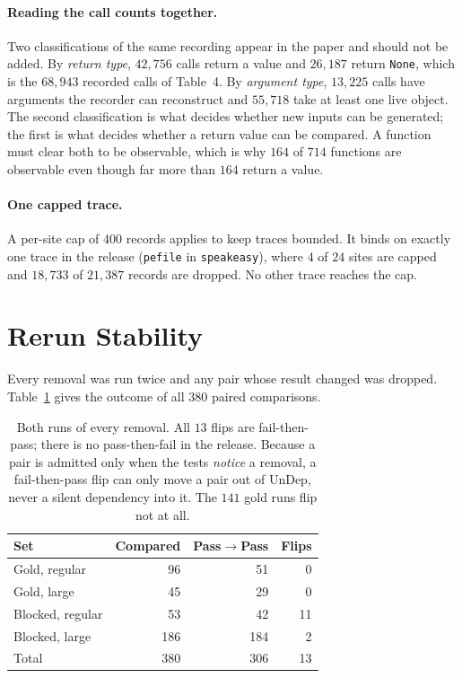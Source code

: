 \paragraph{Reading the call counts together.}
Two classifications of the same recording appear in the paper and should
not be added. By \emph{return type}, $42{,}756$ calls return a value and
$26{,}187$ return \texttt{None}, which is the $68{,}943$ recorded calls
of Table~4. By \emph{argument type}, $13{,}225$ calls have arguments the
recorder can reconstruct and $55{,}718$ take at least one live object.
The second classification is what decides whether new inputs can be
generated; the first is what decides whether a return value can be
compared. A function must clear both to be observable, which is why
$164$ of $714$ functions are observable even though far more than $164$
return a value.

\paragraph{One capped trace.}
A per-site cap of $400$ records applies to keep traces bounded. It binds
on exactly one trace in the release (\texttt{pefile} in
\texttt{speakeasy}), where $4$ of $24$ sites are capped and $18{,}733$
of $21{,}387$ records are dropped. No other trace reaches the cap.

\section{Rerun Stability}
\label{app:flakiness}

Every removal was run twice and any pair whose result changed was
dropped. Table~\ref{tab:flakiness} gives the outcome of all $380$
paired comparisons.

\begin{table}[t]
\centering\small
\begin{tabular}{@{}lrrr@{}}
\toprule
Set & Compared & Pass$\to$Pass & Flips \\
\midrule
Gold, regular     &  96 & 51 & 0 \\
Gold, large       &  45 & 29 & 0 \\
Blocked, regular  &  53 & 42 & 11 \\
Blocked, large    & 186 & 184 & 2 \\
\midrule
Total             & 380 & 306 & 13 \\
\bottomrule
\end{tabular}
\caption{Both runs of every removal. All $13$ flips are
fail-then-pass; there is no pass-then-fail in the release. Because a
pair is admitted only when the tests \emph{notice} a removal, a
fail-then-pass flip can only move a pair out of UnDep, never a silent
dependency into it. The $141$ gold runs flip not at all.}
\label{tab:flakiness}
\end{table}


